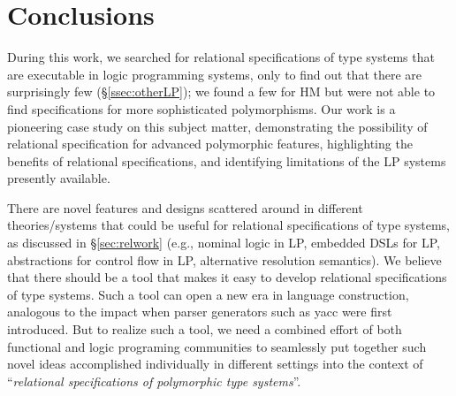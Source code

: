 \documentclass[runningheads,a4paper]{llncs}
\begin{document}
\section{Conclusions}\label{sec:concl}\vspace*{-.5ex}
During this work, we searched for relational specifications of type systems
that are executable in logic programming systems, only to find out that there
are surprisingly few (\S\ref{ssec:otherLP}); we found a few for HM but were not
able to find specifications for more sophisticated polymorphisms.
Our work is a pioneering case study on this subject matter,
demonstrating the possibility of relational specification for advanced
polymorphic features, highlighting the benefits of relational specifications,
and identifying limitations of the LP systems presently available.

There are novel features and designs scattered around in different
theories/systems that could be useful for relational specifications of
type systems, as discussed in \S\ref{sec:relwork} (e.g.,
nominal logic in LP, embedded DSLs for LP, abstractions
for control flow in LP, alternative resolution semantics). We believe
that there should be a tool that makes it easy to develop relational
specifications of type systems. Such a tool can open a new era
in language construction, analogous to the impact when parser generators
such as yacc were first introduced. But to realize such a tool, we need
a combined effort of both functional and logic programing communities to
seamlessly put together such novel ideas accomplished individually
in different settings into the context of ``\emph{relational specifications
of polymorphic type systems}''.

% 
% 
% 
% 
\end{document}
